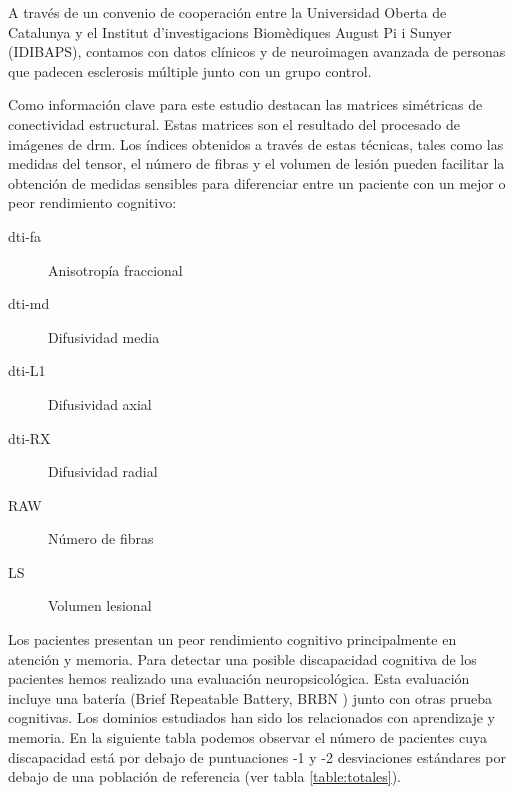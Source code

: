 A través de un convenio de cooperación entre la Universidad Oberta de Catalunya y el Institut d'investigacions Biomèdiques August Pi i Sunyer (IDIBAPS), contamos con datos clínicos y de neuroimagen avanzada de personas que padecen esclerosis múltiple junto con un grupo control.

Como información clave para este estudio destacan las matrices simétricas de conectividad estructural. Estas matrices son el resultado del procesado de imágenes de \gls{drm}. Los índices obtenidos a través de estas técnicas, tales como las medidas del tensor, el número de fibras y el volumen de lesión pueden facilitar la obtención de medidas sensibles para diferenciar entre un paciente con un mejor o peor rendimiento cognitivo:

\begin{description}
 \item [\gls{dti}-\gls{fa}] Anisotropía fraccional
 \item [\gls{dti}-\gls{md}] Difusividad media
 \item [\gls{dti}-L1] Difusividad axial
 \item [\gls{dti}-RX] Difusividad radial
 \item [RAW] Número de fibras
 \item [LS] Volumen lesional
\end{description}

Los pacientes presentan un peor rendimiento cognitivo principalmente en atención y memoria. Para detectar una posible discapacidad cognitiva de los pacientes hemos realizado una evaluación neuropsicológica. Esta evaluación incluye una batería (Brief Repeatable Battery, BRBN \cite{Boringa2001ThePractice}) junto con otras prueba cognitivas. Los dominios estudiados han sido los relacionados con aprendizaje y memoria. En la siguiente tabla podemos observar el número de pacientes cuya discapacidad está por debajo de puntuaciones -1 y -2 desviaciones estándares por debajo de una población de referencia (ver tabla \ref{table:totales}).

